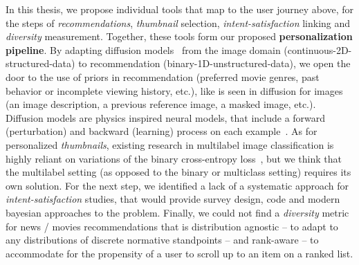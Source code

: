


In this thesis, we propose individual tools that map to the user journey above, for the steps of \emph{recommendations}, \emph{thumbnail} selection, \emph{intent-satisfaction} linking and \emph{diversity} measurement. Together, these tools form our proposed \textbf{personalization pipeline}. By adapting diffusion models~\cite{jascha} from the image domain (continuous-2D-structured-data) to recommendation (binary-1D-unstructured-data), we open the door to the use of priors in recommendation (preferred movie genres, past behavior or incomplete viewing history, etc.), like is seen in diffusion for images (an image description, a previous reference image, a masked image, etc.). Diffusion models are physics inspired neural models, that include a forward (perturbation) and backward (learning) process on each example~\cite{jascha}. As for personalized \emph{thumbnails}, existing research in multilabel image classification is highly reliant on variations of the binary cross-entropy loss~\cite{fisher}, but we think that the multilabel setting (as opposed to the binary or multiclass setting) requires its own solution. For the next step, we identified a lack of a systematic approach for \emph{intent-satisfaction} studies, that would provide survey design, code and modern bayesian approaches to the problem. Finally, we could not find a \emph{diversity} metric for news / movies recommendations that is distribution agnostic -- to adapt to any distributions of discrete normative standpoints -- and rank-aware -- to accommodate for the propensity of a user to scroll up to an item on a ranked list.





